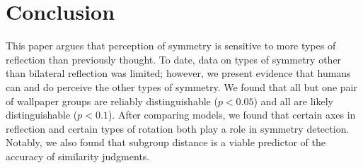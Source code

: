\section{Conclusion}
This paper argues that perception of symmetry is sensitive to more types of reflection than previously thought. To date, data on types of symmetry other than bilateral reflection was limited; however, we present evidence that humans can and do perceive the other types of symmetry. We found that all but one pair of wallpaper groups are reliably distinguishable ($p < 0.05$) and all are likely distinguishable ($p < 0.1$). After comparing models, we found that certain axes in reflection and certain types of rotation both play a role in symmetry detection. Notably, we also found that subgroup distance is a viable predictor of the accuracy of similarity judgments.